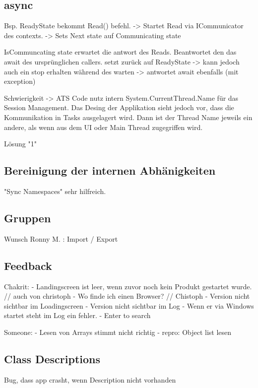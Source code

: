 \subsection{async}
Bsp. ReadyState bekommt Read() befehl.
-> Startet Read via ICommunicator des contexts.
-> Sets Next state auf Communicating state

IsCommuncating state erwartet die antwort des Reads.
Beantwortet den das await des ursprünglichen callers.
setzt zurück auf ReadyState
-> kann jedoch auch ein stop erhalten während des warten
   -> antwortet await ebenfalls (mit exception)

Schwierigkeit -> 
ATS Code nutz intern System.CurrentThread.Name für das Session Management.
Das Desing der Applikation sieht jedoch vor, dass die Kommunikation in Tasks ausgelagert wird.
Dann ist der Thread Name jeweils ein andere, als wenn aus dem UI oder Main Thread zugegriffen wird.

Lösung "1"



\subsection{Bereinigung der internen Abhänigkeiten}
"Sync Namespaces" sehr hilfreich.


\subsection{Gruppen}

Wunsch Ronny M. : Import / Export 


\subsection{Feedback}
Chakrit: 
- Landingscreen ist leer, wenn zuvor noch kein Produkt gestartet wurde. // auch von christoph
   - Wo finde ich einen Browser? // Chistoph
- Version nicht sichtbar im Loadingscreen
- Version nicht sichtbar im Log
- Wenn er via Windows startet steht im Log ein fehler.
- Enter to search

Someone:
- Lesen von Arrays stimmt nicht richtig
   - repro: Object list lesen

\subsection{Class Descriptions}



Bug, dass app crasht, wenn Description nicht vorhanden

